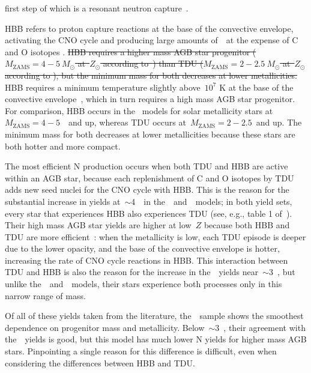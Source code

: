 \documentclass[ms.tex]{subfiles}
\begin{document}
first step of which is a resonant neutron capture~\citep{Cristallo2011}.
\par
HBB refers to proton capture reactions at the base of the convective envelope,
activating the CNO cycle and producing large amounts of~\Nfourteen~at the
expense of C and O isotopes
{\color{red}
\citep*[e.g.,][]{Scalo1975, Bloecker1991}.
\sout{
HBB requires a higher mass AGB star progenitor ($M_\text{ZAMS} = 4 - 5~M_\odot$
at~$Z_\odot$ according to~\mbox{\citealt{Karakas2010}}) than TDU
($M_\text{ZAMS} = 2 - 2.5~M_\odot$ at~$Z_\odot$ according to
\mbox{\citealt{Karakas2010}}), but the minimum mass for both decreases at lower
metallicities.
}
HBB requires a minimum temperature slightly above~$10^7$ K at the base of the
convective envelope~\citep[e.g.,][]{Sackmann1991}, which in turn requires a
high mass AGB star progenitor.
For comparison, HBB occurs in the~\citet{Karakas2010} models for solar
metallicity stars at~$M_\text{ZAMS} = 4 - 5$~\msun~and up, whereas TDU occurs
at~$M_\text{ZAMS} = 2 - 2.5$~\msun and up.
The minimum mass for both decreases at lower metallicities because these stars
are both hotter and more compact.
}
\par
The most efficient N production occurs when both TDU and HBB are active within
an AGB star, because each replenishment of C and O isotopes by TDU adds new
seed nuclei for the CNO cycle with HBB.
This is the reason for the substantial increase in yields at~$\sim$4~\msun~in
the~\karakasten~and~\karakas~models; in both yield sets, every star that
experiences HBB also experiences TDU (see, e.g., table 1
of~\citealp{Karakas2010}).
Their high mass AGB star yields are higher at low~$Z$ because both HBB and TDU
are more efficient~\citep[see discussion in][]{Ventura2013}: when the
metallicity is low, each TDU episode is deeper due to the lower opacity, and
the base of the convective envelope is hotter, increasing the rate of CNO cycle
reactions in HBB.
This interaction between TDU and HBB is also the reason for the increase in
the~\ventura~yields near~$\sim$3~\msun, but unlike
the~\karakasten~and~\karakas~models, their stars experience both processes only
in this narrow range of mass.
\par
Of all of these yields taken from the literature, the~\cristallo~sample shows
the smoothest dependence on progenitor mass and metallicity.
Below~$\sim$3~\msun, their agreement with the~\karakas~yields is good, but this
model has much lower N yields for higher mass AGB stars.
Pinpointing a single reason for this difference is difficult, even when
considering the differences between HBB and TDU.
\end{document}
